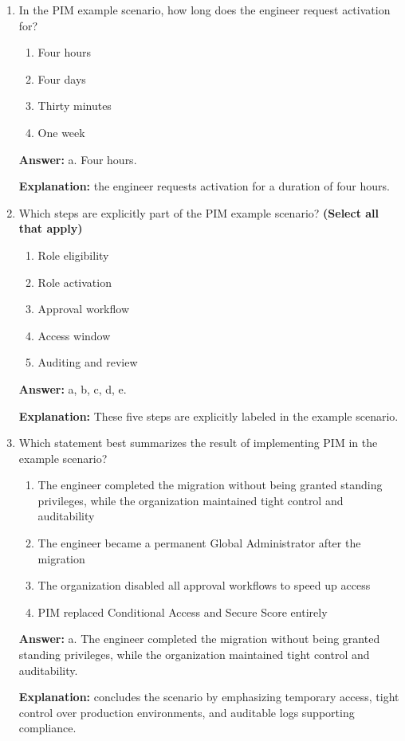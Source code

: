 \documentclass[10pt]{article}
\begin{document}
\begin{enumerate}[leftmargin=*]
\item In the PIM example scenario, how long does the engineer request activation for?
\begin{enumerate}[label=\alph*., leftmargin=1.5em]
\item Four hours
\item Four days
\item Thirty minutes
\item One week
\end{enumerate}
\textbf{Answer:} a. Four hours.

\textbf{Explanation:} the engineer requests activation for a duration of four hours.

\item Which steps are explicitly part of the PIM example scenario? \textbf{(Select all that apply)}
\begin{enumerate}[label=\alph*., leftmargin=1.5em]
\item Role eligibility
\item Role activation
\item Approval workflow
\item Access window
\item Auditing and review
\end{enumerate}
\textbf{Answer:} a, b, c, d, e.

\textbf{Explanation:} These five steps are explicitly labeled in the example scenario.

\item Which statement best summarizes the result of implementing PIM in the example scenario?
\begin{enumerate}[label=\alph*., leftmargin=1.5em]
\item The engineer completed the migration without being granted standing privileges, while the organization maintained tight control and auditability
\item The engineer became a permanent Global Administrator after the migration
\item The organization disabled all approval workflows to speed up access
\item PIM replaced Conditional Access and Secure Score entirely
\end{enumerate}
\textbf{Answer:} a. The engineer completed the migration without being granted standing privileges, while the organization maintained tight control and auditability.

\textbf{Explanation:} concludes the scenario by emphasizing temporary access, tight control over production environments, and auditable logs supporting compliance.

\end{enumerate}
\end{document}
